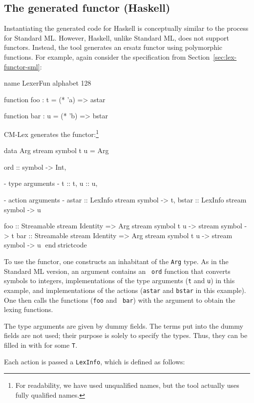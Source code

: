 \documentclass[10pt]{article}
\begin{document}
\begin{strictcode}
\subsection{The generated functor (Haskell)}
\label{sec:lex-functor-hs}

Instantiating the generated code for Haskell is conceptually similar
to the process for Standard ML.  However, Haskell, unlike Standard ML,
does not support functors.  Instead, the tool generates an ersatz
functor using polymorphic functions.  For example, again consider the
specification from Section~\ref{sec:lex-functor-sml}:

\begin{code}
name LexerFun
alphabet 128

function foo : t =
  (* 'a) => astar

function bar : u =
  (* 'b) => bstar
\end{code}


CM-Lex generates the functor:\footnote{For readability, we have
used unqualified names, but the tool actually uses fully qualified names.}


\begin{strictcode}
data Arg stream symbol t u =
   Arg { ord :: symbol -> Int,

         {- type arguments -}
         t :: t,
         u :: u,

         {- action arguments -}
         astar :: LexInfo stream symbol -> t,
         bstar :: LexInfo stream symbol -> u }

foo :: Streamable stream Identity
       => Arg stream symbol t u -> stream symbol -> t
bar :: Streamable stream Identity
       => Arg stream symbol t u -> stream symbol -> u
endstrictcode


To use the functor, one constructs an inhabitant of the {\tt Arg}
type.  As in the Standard ML version, an argument contains an {\tt
ord} function that converts symbols to integers, implementations of
the type arguments ({\tt t} and {\tt u}) in this example, and
implementations of the actions ({\tt astar} and {\tt bstar} in this
example).  One then calls the functions ({\tt foo} and {\tt
bar}) with the argument to obtain the lexing functions.

The type arguments are given by dummy fields.  The terms put into the
dummy fields are not used; their purpose is solely to specify the
types.  Thus, they can be filled in with  for
some {\tt T}.

Each action is passed a {\tt LexInfo}, which is defined as follows:


\end{strictcode}
\end{strictcode}
\end{document}
